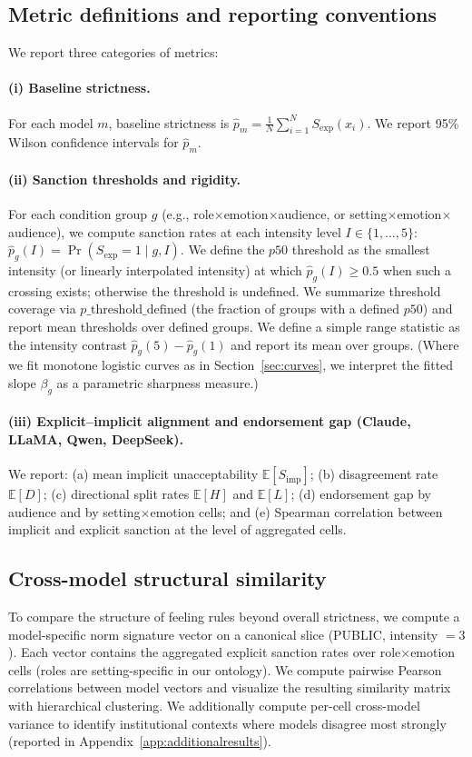 \documentclass[11pt]{article}
\begin{document}
\subsection{Metric definitions and reporting conventions}
\label{app:metrics}
We report three categories of metrics:

\paragraph{(i) Baseline strictness.}
For each model $m$, baseline strictness is
$\hat{p}_m = \frac{1}{N}\sum_{i=1}^N S_{\mathrm{exp}}(x_i)$.
We report 95\% Wilson confidence intervals for $\hat{p}_m$.

\paragraph{(ii) Sanction thresholds and rigidity.}
For each condition group $g$ (e.g., role$\times$emotion$\times$audience, or setting$\times$emotion$\times$audience),
we compute sanction rates at each intensity level $I\in\{1,\dots,5\}$:
$\hat{p}_g(I)=\Pr(S_{\mathrm{exp}}=1\mid g,I)$.
We define the $p50$ threshold as the smallest intensity (or linearly interpolated intensity) at which $\hat{p}_g(I)\ge 0.5$ when such a crossing exists; otherwise the threshold is undefined.
We summarize threshold coverage via $p\_\mathrm{threshold\_defined}$ (the fraction of groups with a defined $p50$) and report mean thresholds over defined groups.
We define a simple range statistic as the intensity contrast $\hat{p}_g(5)-\hat{p}_g(1)$ and report its mean over groups.
(Where we fit monotone logistic curves as in Section~\ref{sec:curves}, we interpret the fitted slope $\beta_g$ as a parametric sharpness measure.)

\paragraph{(iii) Explicit--implicit alignment and endorsement gap (Claude, LLaMA, Qwen, DeepSeek).}
We report:
(a) mean implicit unacceptability $\mathbb{E}[S_{\mathrm{imp}}]$;
(b) disagreement rate $\mathbb{E}[D]$;
(c) directional split rates $\mathbb{E}[H]$ and $\mathbb{E}[L]$;
(d) endorsement gap by audience and by setting$\times$emotion cells; and
(e) Spearman correlation between implicit and explicit sanction at the level of aggregated cells.

\subsection{Cross-model structural similarity}
\label{app:similarity}
To compare the structure of feeling rules beyond overall strictness, we compute a model-specific norm signature vector on a canonical slice (PUBLIC, intensity $=3$).
Each vector contains the aggregated explicit sanction rates over role$\times$emotion cells (roles are setting-specific in our ontology).
We compute pairwise Pearson correlations between model vectors and visualize the resulting similarity matrix with hierarchical clustering.
We additionally compute per-cell cross-model variance to identify institutional contexts where models disagree most strongly (reported in Appendix~\ref{app:additionalresults}).
\end{document}
